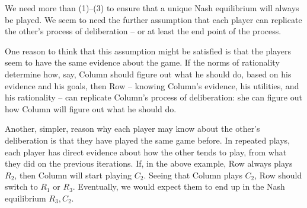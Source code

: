 We need more than (1)--(3) to ensure that a unique Nash equilibrium will always
be played. We seem to need the further assumption that each player can replicate
the other's process of deliberation -- or at least the end point of the process.

One reason to think that this assumption might be satisfied is that the players
seem to have the same evidence about the game. If the norms of rationality
determine how, say, Column should figure out what he should do, based on his
evidence and his goals, then Row -- knowing Column's evidence, his utilities,
and his rationality -- can replicate Column's process of deliberation: she can
figure out how Column will figure out what he should do.

Another, simpler, reason why each player may know about the other's deliberation
is that they have played the same game before. In repeated plays, each player
has direct evidence about how the other tends to play, from what they did on the
previous iterations. If, in the above example, Row always plays $R_{2}$, then
Column will start playing $C_{2}$. Seeing that Column plays $C_{2}$, Row should
switch to $R_{1}$ or $R_{3}$. Eventually, we would expect them to end up in the
Nash equilibrium $R_{3},C_{2}$.


